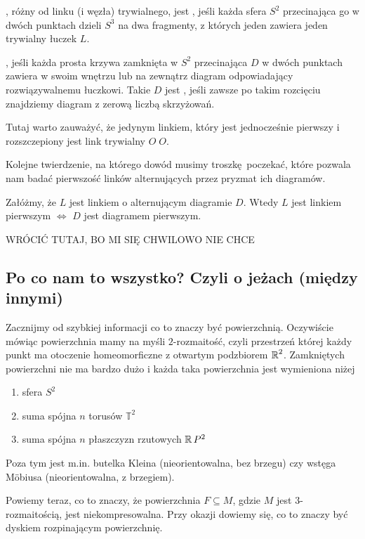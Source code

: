 \documentclass{article}
\begin{document}
\begin{deff}
  , różny od linku (i węzła) trywialnego, jest , jeśli każda sfera $S^2$ przecinająca go w dwóch punktach dzieli $S^3$ na dwa fragmenty, z których jeden zawiera jeden trywialny łuczek $L$.

  , jeśli każda prosta krzywa zamknięta w $S^2$ przecinająca $D$ w dwóch punktach zawiera w swoim wnętrzu lub na zewnątrz diagram odpowiadający rozwiązywalnemu łuczkowi. Takie $D$ jest , jeśli zawsze po takim rozcięciu znajdziemy diagram z zerową liczbą skrzyżowań. 
\end{deff}

Tutaj warto zauważyć, że jedynym linkiem, który jest jednocześnie pierwszy i rozszczepiony jest link trywialny $O\;O$.

Kolejne twierdzenie, na którego dowód musimy troszkę poczekać, które pozwala nam badać pierwszość linków alternujących przez pryzmat ich diagramów.
\begin{thm}
  Załóżmy, że $L$ jest linkiem o alternującym diagramie $D$. Wtedy $L$ jest linkiem pierwszym $\iff$ $D$ jest diagramem pierwszym.
\end{thm}

{\large\color{red}WRÓCIĆ TUTAJ, BO MI SIĘ CHWILOWO NIE CHCE}

\subsection{Po co nam to wszystko? Czyli o jeżach (między innymi)}

Zacznijmy od szybkiej informacji co to znaczy być powierzchnią. Oczywiście mówiąc powierzchnia mamy na myśli $2$-rozmaitość, czyli przestrzeń której każdy punkt ma otoczenie homeomorficzne z otwartym podzbiorem $\operatorname{\mathbb{R}}^2$. Zamkniętych powierzchni nie ma bardzo dużo i każda taka powierzchnia jest wymieniona niżej
\begin{enumerate}
  \item sfera $S^2$
  \item suma spójna $n$ torusów $\mathbb{T}^2$
  \item suma spójna $n$ płaszczyzn rzutowych $\operatorname{\mathbb{R}} P^2$
\end{enumerate}
Poza tym jest m.in. butelka Kleina (nieorientowalna, bez brzegu) czy wstęga M\"obiusa (nieorientowalna, z brzegiem).

Powiemy teraz, co to znaczy, że powierzchnia $F\subseteq M$, gdzie $M$ jest $3$-rozmaitością, jest niekompresowalna. Przy okazji dowiemy się, co to znaczy być dyskiem rozpinającym powierzchnię.
\end{document}
